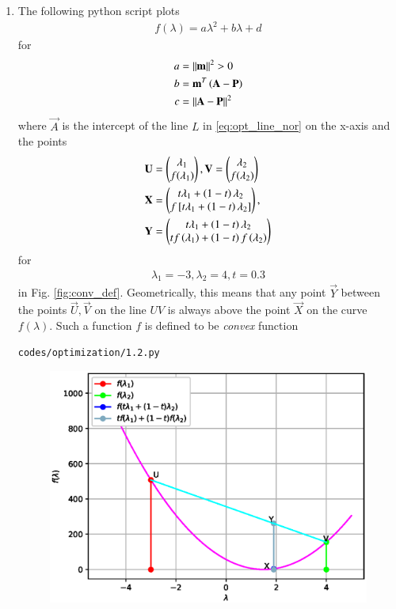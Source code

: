 \renewcommand{\theequation}{\theenumi}

\begin{enumerate}[label=\arabic*.,ref=\thesection.\theenumi]

\item
The following python script plots 
%
\begin{align}
f(\lambda) = a\lambda^2 + b\lambda + d
\label{eq:parab}
\end{align}
%
for 
\begin{align}
a &= \left\lVert\mathbf{m}\right\rVert^2 > 0
\\
b &= \mathbf{m}^T\left(\mathbf{A} -\mathbf{P}\right) 
\\
c &= \left\lVert\mathbf{A} -\mathbf{P}\right\rVert^2
\end{align}
where $\vec{A}$ is the intercept of the line $L$ in \eqref{eq:opt_line_nor}
on the x-axis and the points
\begin{align}
\mathbf{U} &= \begin{pmatrix}\lambda_1\\f(\lambda_1)\end{pmatrix}, 
\mathbf{V} = \begin{pmatrix}\lambda_2\\f(\lambda_2)\end{pmatrix}
\\
\mathbf{X} &= \begin{pmatrix}t \lambda_1 + \left(1-t\right)\lambda_2 \\ f{}\left[t \lambda_1 + \left(1-t\right)\lambda_2\right]\end{pmatrix},
\\
\mathbf{Y} &= \begin{pmatrix}t \lambda_1 + \left(1-t\right)\lambda_2 \\ t f\left(\lambda_1\right) + \left(1-t\right)f\left(\lambda_2\right)\end{pmatrix}
\end{align}
%
for 
\begin{align}
\lambda_1 = -3, 
\lambda_2 = 4, 
t = 0.3
\end{align}
in Fig. \ref{fig:conv_def}. Geometrically, this means that any point $\vec{Y}$ between the points $\vec{U}, \vec{V}$ on the line $UV$ is always above the point $\vec{X}$ on the curve $f(\lambda)$.
Such a  function $f$ is defined to be {\em convex} function 
%
\begin{lstlisting}
codes/optimization/1.2.py
\end{lstlisting}
%
\begin{figure}[!ht]
\centering
\includegraphics[width=\columnwidth]{./figs/convex.eps}

\end{figure}
\end{enumerate}
